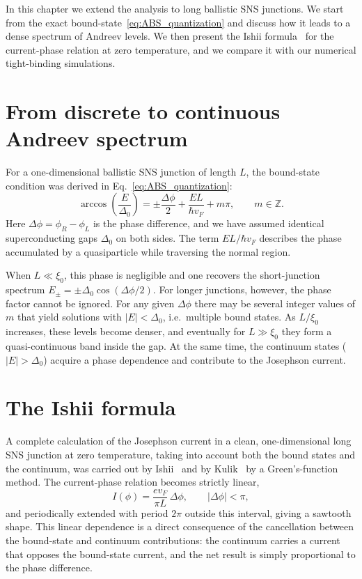 \documentclass[11pt,a4paper,twoside,openany]{report}
\begin{document}
In this chapter we extend the analysis to long ballistic SNS junctions.  We start from the exact bound-state~\eqref{eq:ABS_quantization} and discuss how it leads to a dense spectrum of Andreev levels.  We then present the Ishii formula~\cite{ishii_josephson_1970} for the current-phase relation at zero temperature, and we compare it with our numerical tight-binding simulations.

\section{From discrete to continuous Andreev spectrum}

For a one-dimensional ballistic SNS junction of length \(L\), the bound-state condition was derived in Eq.~\eqref{eq:ABS_quantization}:
\begin{equation}
  \arccos\!\left(\frac{E}{\Delta_0}\right) = \pm \frac{\Delta\phi}{2} + \frac{E L}{\hbar v_F} + m\pi, \qquad m \in \mathbb{Z}.
  \label{eq:long_ABS}
\end{equation}
Here \(\Delta\phi = \phi_R - \phi_L\) is the phase difference, and we have assumed identical superconducting gaps \(\Delta_0\) on both sides.  The term \(E L / \hbar v_F\) describes the phase accumulated by a quasiparticle while traversing the normal region.  

When \(L \ll \xi_0\), this phase is negligible and one recovers the short-junction spectrum \(E_{\pm} = \pm \Delta_0 \cos(\Delta\phi/2)\).  For longer junctions, however, the phase factor cannot be ignored.  For any given \(\Delta\phi\) there may be several integer values of \(m\) that yield solutions with \(|E| < \Delta_0\), i.e.\ multiple bound states.  As \(L / \xi_0\) increases, these levels become denser, and eventually for \(L \gg \xi_0\) they form a quasi-continuous band inside the gap.  At the same time, the continuum states (\(|E| > \Delta_0\)) acquire a phase dependence and contribute to the Josephson current.

\section{The Ishii formula}

A complete calculation of the Josephson current in a clean, one-dimensional long SNS junction at zero temperature, taking into account both the bound states and the continuum, was carried out by Ishii~\cite{ishii_josephson_1970} and by Kulik~\cite{kulik_macroscopic_1969} by a Green's-function method. The current-phase relation becomes strictly linear,
\begin{equation}
  \boxed{ I(\phi) = \frac{e v_F}{\pi L}\,\Delta\phi, \qquad |\Delta\phi| < \pi, }
  \label{eq:Ishii}
\end{equation}
and periodically extended with period \(2\pi\) outside this interval, giving a sawtooth shape. This linear dependence is a direct consequence of the cancellation between the bound-state and continuum contributions: the continuum carries a current that opposes the bound-state current, and the net result is simply proportional to the phase difference.
\end{document}
